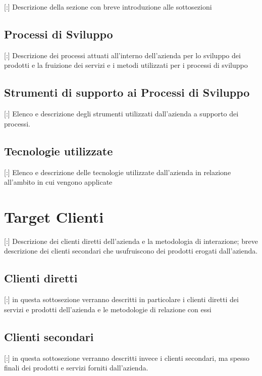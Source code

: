 \documentclass[11pt]{book}              %
\begin{document}
[:] Descrizione della sezione con breve introduzione alle sottosezioni

\subsection{Processi di Sviluppo}

[:] Descrizione dei processi attuati all'interno dell'azienda per lo sviluppo dei prodotti e la fruizione dei servizi e i metodi utilizzati per i processi di sviluppo

\subsection{Strumenti di supporto ai Processi di Sviluppo}

[:] Elenco e descrizione degli strumenti utilizzati dall'azienda a supporto dei processi.

\subsection{Tecnologie utilizzate}

[:] Elenco e descrizione delle tecnologie utilizzate dall'azienda in relazione all'ambito in cui vengono applicate

\section{Target Clienti}

[:] Descrizione dei clienti diretti dell'azienda e la metodologia di interazione; breve descrizione dei clienti secondari che usufruiscono dei prodotti erogati dall'azienda.

\subsection{Clienti diretti}

[:] in questa sottosezione verranno descritti in particolare i clienti diretti dei servizi e prodotti dell'azienda e le metodologie di relazione con essi

\subsection{Clienti secondari}

[:] in questa sottosezione verranno descritti invece i clienti secondari, ma spesso finali dei prodotti e servizi forniti dall'azienda.
\end{document}
